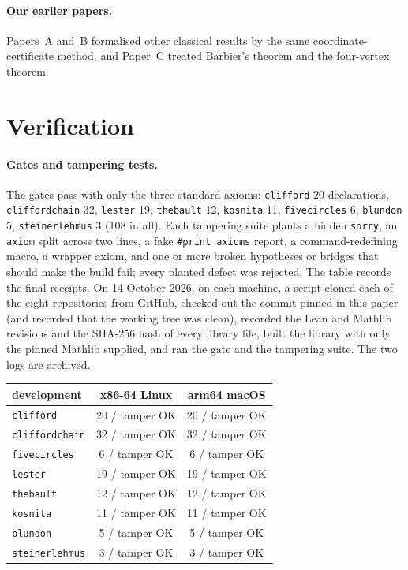 \documentclass[11pt]{article}
\theoremstyle{definition}
\theoremstyle{remark}
\newcommand{\lean}[1]{\texttt{#1}}
\begin{document}
\paragraph{Our earlier papers.} Papers~A \cite{paperA} and~B \cite{paperB} formalised other classical
results by the same coordinate-certificate method, and Paper~C \cite{paperC} treated Barbier's theorem
and the four-vertex theorem.

\section{Verification}\label{sec:verify}

\paragraph{Gates and tampering tests.} The gates pass with only the three standard axioms:
\lean{clifford} 20 declarations, \lean{cliffordchain} 32, \lean{lester} 19, \lean{thebault} 12,
\lean{kosnita} 11, \lean{fivecircles} 6, \lean{blundon} 5, \lean{steinerlehmus} 3 (108 in all). Each
tampering suite plants a hidden \lean{sorry}, an \lean{axiom} split across two lines, a fake
\lean{\#print axioms} report, a command-redefining macro, a wrapper axiom, and one or more broken
hypotheses or bridges that should make the build fail; every planted defect was rejected.
The table records the final receipts. On 14 October 2026, on each machine, a script cloned each of the
eight repositories from GitHub, checked out the commit pinned in this paper (and recorded that the
working tree was clean), recorded the Lean and Mathlib revisions and the SHA-256 hash of every library
file, built the library with only the pinned Mathlib supplied, and ran the gate and the tampering suite.
The two logs are archived.
\begin{center}\small
\begin{tabular}{lcc}
\toprule
development & x86-64 Linux & arm64 macOS\\
\midrule
\lean{clifford} & 20 / tamper OK & 20 / tamper OK\\
\lean{cliffordchain} & 32 / tamper OK & 32 / tamper OK\\
\lean{fivecircles} & 6 / tamper OK & 6 / tamper OK\\
\lean{lester} & 19 / tamper OK & 19 / tamper OK\\
\lean{thebault} & 12 / tamper OK & 12 / tamper OK\\
\lean{kosnita} & 11 / tamper OK & 11 / tamper OK\\
\lean{blundon} & 5 / tamper OK & 5 / tamper OK\\
\lean{steinerlehmus} & 3 / tamper OK & 3 / tamper OK\\
\bottomrule
\end{tabular}
\end{center}
\end{document}
